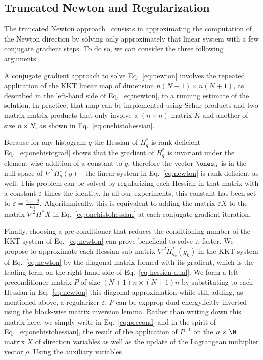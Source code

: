  \subsection{Truncated Newton and Regularization} The truncated Newton approach~\cite{nash2000survey} consists in approximating the computation of the Newton direction by solving only approximately that linear system with a few conjugate gradient steps. To do so, we can consider the three following arguments:
 
 A conjugate gradient approach to solve Eq.~\eqref{eq:newton} involves the repeated application of the KKT linear map of dimension $n(N+1)\times n(N+1)$, as described in the left-hand side of Eq.~\eqref{eq:newton}, to a running estimate of the solution. In practice, that map can be implemented using Schur products and two matrix-matrix products that only involve a $(n\times n)$ matrix $K$ and another of size $n\times N$, as shown in Eq.~\eqref{eq:onehistohessian}.
 
 Because for any histogram $q$ the Hessian of $H^*_q$ is rank deficient---Eq.~\eqref{eq:onehistograd} shows that the gradient of $H^*_q$ is invariant under the element-wise addition of a constant to $g$, therefore the vector $\ones_n$ is in the null space of $\nabla^2 H^\star_q(g)$---the linear system in Eq.~\eqref{eq:newton} is rank deficient as well. This problem can be solved by regularizing each Hessian in that matrix with a constant $\varepsilon$ times the identity. In all our experiments, this constant has been set to $\varepsilon=\frac{1e-2}{n\gamma}$. Algorithmically, this is equivalent to adding the matrix $\varepsilon X$ to the matrix $\nabla^2H^* X$ in Eq.~\eqref{eq:onehistohessian} at each conjugate gradient iteration. 
 
 Finally, choosing a pre-conditioner that reduces the conditioning number of the KKT system of Eq.~\eqref{eq:newton} can  prove beneficial to solve it faster. We propose to approximate each Hessian sub-matrix $\nabla^2 H^*_{q_k}(g_k)$ in the KKT system of Eq.~\eqref{eq:newton} by the diagonal matrix formed with its gradient, which is the leading term on the right-hand-side of Eq.~\eqref{eq-hessien-dual}. We form a left-preconditioner matrix $P$ of size $(N+1)n\times (N+1)n$ by substituting to each Hessian in Eq.~\eqref{eq:newton} this diagonal approximation while still adding, as mentioned above, a regularizer $\varepsilon$. $P$ can be expprop-dual-energylicitly inverted using the block-wise matrix inversion lemma. Rather than writing down this matrix here, we simply write in Eq.~\eqref{eq:precond} and in the spirit of Eq.~\eqref{eq:onehistohessian}, the result of the application of $P^{-1}$ on the $n\times \N$ matrix $X$ of direction variables as well as the update of the Lagrangean multiplier vector $\rho$. Using the auxiliary variables
 
